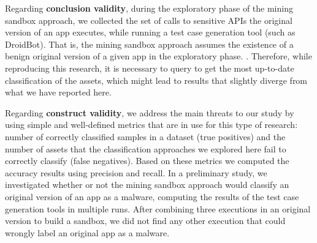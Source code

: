 Regarding {\bf conclusion validity}, during the exploratory phase of the mining sandbox approach,
we collected the set of calls to sensitive APIs the original version of
an app executes, while running a test case generation tool (such as
DroidBot). That is, the mining sandbox approach assumes the existence of a benign original
version of a given app in the exploratory phase. .
Therefore, while reproducing this research, it is necessary to query \vt to get the most
up-to-date classification of the assets, which might lead to results that slightly
diverge from what we have reported here.

\begin{comment}
    
Regarding the \textbf{correlation between dataset properties and accuracy drop}, after running statistical tests (logistic regression),
we could not find evidence that the \emph{diversity} of the
complete dataset---in terms of similarity score and types of malware-
is responsible for the higher number of false negatives of the mining
sandbox approach. This implies that there was no 1-1 correlation between the brackets of similarity index, malware types to the drops in accuracy. Therefore, further research is necessary to investigate
other possible reasons for that. Perhaps, the complete dataset
contains a large percentage of malware that use more
advanced techniques to evade from both static and dynamic analysis---
both methods are used in the mining sandbox approach
we discussed in this paper.


\end{comment}


Regarding {\bf construct validity}, we address the main threats
to our study by using simple and well-defined metrics that are
in use for this type of research: number of correctly classified
samples in a dataset (true positives) and the number of assets that the
classification approaches we explored here fail to
correctly classify (false negatives). Based on these metrics we computed
the accuracy results using precision and recall. In a preliminary study, we
investigated whether or not the mining sandbox approach
would classify an original version of an app as a malware,
computing the results of the test case generation tools in multiple
runs. After combining three executions in an original version to
build a sandbox, we did not find any other execution that
could wrongly label an original app as a malware. 

